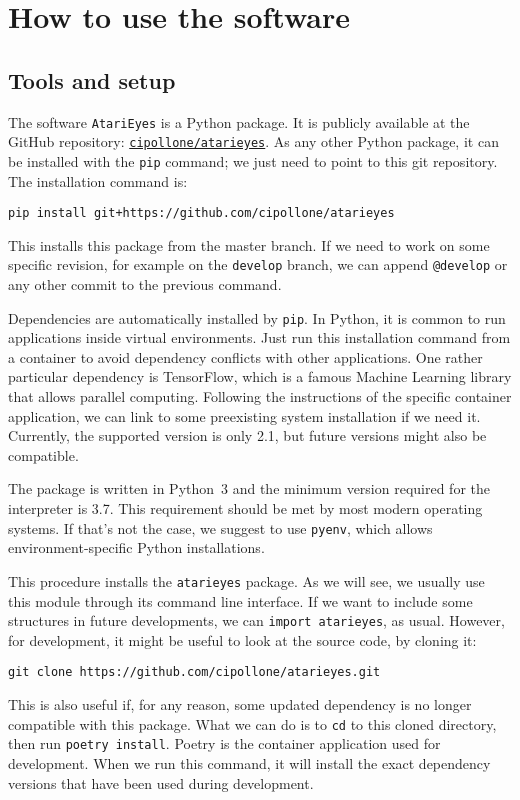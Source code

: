 \section{How to use the software}

\label{sec:how-to-use}

\subsection{Tools and setup}

The software \texttt{AtariEyes} is a Python package. It is publicly available
at the GitHub repository:
\href{https://github.com/cipollone/atarieyes}{\texttt{cipollone/atarieyes}}.
As any other Python package, it can be installed with the \texttt{pip}
command; we just need to point to this git repository. The installation
command is:
\begin{lstlisting}[style=bash]
pip install git+https://github.com/cipollone/atarieyes
\end{lstlisting}
This installs this package from the master branch. If we need to work on some
specific revision, for example on the \texttt{develop} branch, we can append
\verb!@develop! or any other commit to the previous command.

Dependencies are automatically installed by \texttt{pip}.  In Python, it is
common to run applications inside virtual environments. Just run this
installation command from a container to avoid dependency conflicts with
other applications. One rather particular dependency is TensorFlow, which is a
famous Machine Learning library that allows parallel computing. Following the
instructions of the specific container application, we can link to some
preexisting system installation if we need it. Currently, the supported
version is only 2.1, but future versions might also be compatible.

The package is written in Python~3 and the minimum version required for the
interpreter is 3.7. This requirement should be met by most modern operating
systems. If that's not the case, we suggest to use \texttt{pyenv}, which
allows environment-specific Python installations.

This procedure installs the \texttt{atarieyes} package. As we will see, we
usually use this module through its command line interface. If we want to
include some structures in future developments, we can
\lstinline[style=inlinepy]|import atarieyes|, as usual. However, for
development, it might be useful to look at the source code, by cloning it:
\begin{lstlisting}[style=bash]
git clone https://github.com/cipollone/atarieyes.git
\end{lstlisting}
This is also useful if, for any reason, some updated dependency is no longer
compatible with this package. What we can do is to \texttt{cd} to this cloned
directory, then run \texttt{poetry install}. Poetry is the container
application used for development. When we run this command, it will install
the exact dependency versions that have been used during development.


